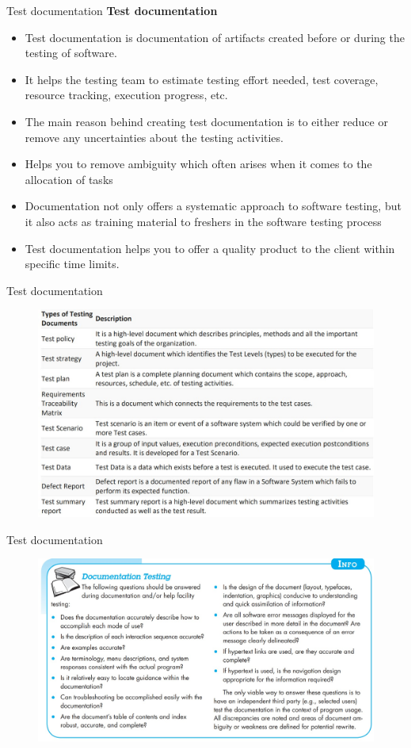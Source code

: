 \documentclass{beamer}
\begin{document}
\begin{frame}{Test documentation}
	\textbf{Test documentation}
\begin{itemize}
	\item Test documentation is documentation of artifacts created before or during the testing of software.
	\item It helps the testing team to estimate testing effort needed, test coverage, resource tracking, execution progress, etc. 
	\item The main reason behind creating test documentation is to either reduce or remove any uncertainties 
	about the testing activities.
	\item Helps you to remove ambiguity which often arises when it comes to the 
	allocation of tasks
	\item Documentation not only offers a systematic approach to software testing, but it also acts as training 
	material to freshers in the software testing process
	\item Test documentation helps you to offer a quality product to the client within specific time limits.

\end{itemize}
\end{frame}
\begin{frame}{Test documentation}
	\begin{figure}
	\includegraphics[scale=.5]{img/m3_51}
\end{figure}
\end{frame}
\begin{frame}{Test documentation}
	\begin{figure}
	\includegraphics[scale=.4]{img/m3_27}
\end{figure}
\end{frame}
\end{document}
